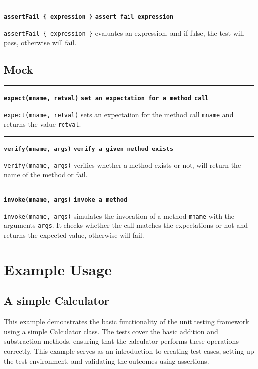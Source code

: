 \documentclass[letterpaper,12pt]{article}
\begin{document}
\bigskip
\hrule\vspace{0.1cm}
\noindent
{\tt\bf assertFail \{ expression \}} \hfill {\tt\bf assert fail expression}

\vspace{0.1cm}
\noindent
\texttt{assertFail \{ expression \}} evaluates an expression, and if false, the test will pass, otherwise will fail.

\subsection{Mock}

\bigskip
\hrule\vspace{0.1cm}
\noindent
{\tt\bf expect(mname, retval)} \hfill {\tt\bf set an expectation for a method call}

\vspace{0.1cm}
\noindent
\texttt{expect(mname, retval)} sets an expectation for the method call \texttt{mname} and returns the value \texttt{retval}.

\bigskip
\hrule\vspace{0.1cm}
\noindent
{\tt\bf verify(mname, args)} \hfill {\tt\bf verify a given method exists}

\vspace{0.1cm}
\noindent
\texttt{verify(mname, args)} verifies whether a method exists or not, will return the name of the method or fail.

\bigskip
\hrule\vspace{0.1cm}
\noindent
{\tt\bf invoke(mname, args)} \hfill {\tt\bf invoke a method}

\vspace{0.1cm}
\noindent
\texttt{invoke(mname, args)} simulates the invocation of a method \texttt{mname} with the arguments \texttt{args}. It checks whether the call matches the expectations or not and returns the expected value, otherwise will fail.

\newpage\section{Example Usage}

\subsection{A simple Calculator}

This example demonstrates the basic functionality of the unit testing framework using a simple Calculator class. The tests cover the basic addition and substraction methods, ensuring that the calculator performs these operations correctly. This example serves as an introduction to creating test cases, setting up the test environment, and validating the outcomes using assertions.
\end{document}
